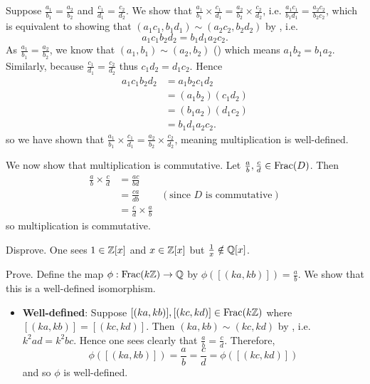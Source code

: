 \begin{questions}
    \item Suppose $\frac{a_1}{b_1} = \frac{a_2}{b_2}$ and $\frac{c_1}{d_1} = \frac{c_2}{d_2}$. We show that $\frac{a_1}{b_1} \times \frac{c_1}{d_1} = \frac{a_2}{b_2} \times \frac{c_2}{d_2}$, i.e. $\frac{a_1c_1}{b_1d_1} = \frac{a_2c_2}{b_2c_2}$, which is equivalent to showing that $(a_1c_1, b_1d_1) \mathrel{\sim} (a_2c_2, b_2d_2)$ by , i.e.
    \[
        a_1c_1b_2d_2 = b_1d_1a_2c_2.
    \]
    As $\frac{a_1}{b_1} = \frac{a_2}{b_2}$, we know that $(a_1, b_1) \mathrel{\sim} (a_2, b_2)$ () which means $a_1b_2 = b_1a_2$. Similarly, because $\frac{c_1}{d_1} = \frac{c_2}{d_2}$ thus $c_1d_2 = d_1c_2$. Hence
    \begin{align*}
        a_1c_1b_2d_2 &= a_1b_2c_1d_2\\
        &= (a_1b_2)(c_1d_2)\\
        &= (b_1a_2)(d_1c_2)\\
        &= b_1d_1a_2c_2.
    \end{align*}
    so we have shown that $\frac{a_1}{b_1} \times \frac{c_1}{d_1} = \frac{a_2}{b_2} \times \frac{c_2}{d_2}$, meaning multiplication is well-defined.

    We now show that multiplication is commutative. Let $\frac ab, \frac cd \in \mathrm{Frac}(D)$. Then
    \begin{align*}
        \frac ab \times \frac cd &= \frac{ac}{bd}\\
        &= \frac{ca}{db} & (\text{since } D \text{ is commutative})\\
        &= \frac cd \times \frac ab
    \end{align*}
    so multiplication is commutative.

    \item \begin{partquestions}{\alph*}
        \item Disprove. One sees $1 \in \mathbb{Z}[x]$ and $x \in \mathbb{Z}[x]$ but $\frac1x \notin \mathbb{Q}[x]$.

        \item Prove. Define the map $\phi: \mathrm{Frac}(k\mathbb{Z}) \to \mathbb{Q}$ by $\phi([(ka, kb)]) = \frac ab$. We show that this is a well-defined isomorphism.
        \begin{itemize}
            \item \textbf{Well-defined}: Suppose $[(ka, kb)], [(kc, kd)] \in \mathrm{Frac}(k\mathbb{Z})$ where $[(ka,kb)]=[(kc,kd)]$. Then $(ka, kb) \mathrel{\sim} (kc, kd)$ by , i.e. $k^2ad = k^2bc$. Hence one sees clearly that $\frac ab = \frac cd$. Therefore,
            \[
                \phi([(ka,kb)]) = \frac ab = \frac cd = \phi([(kc, kd)])
            \]
            and so $\phi$ is well-defined.


\end{itemize}
\end{partquestions}
\end{questions}
